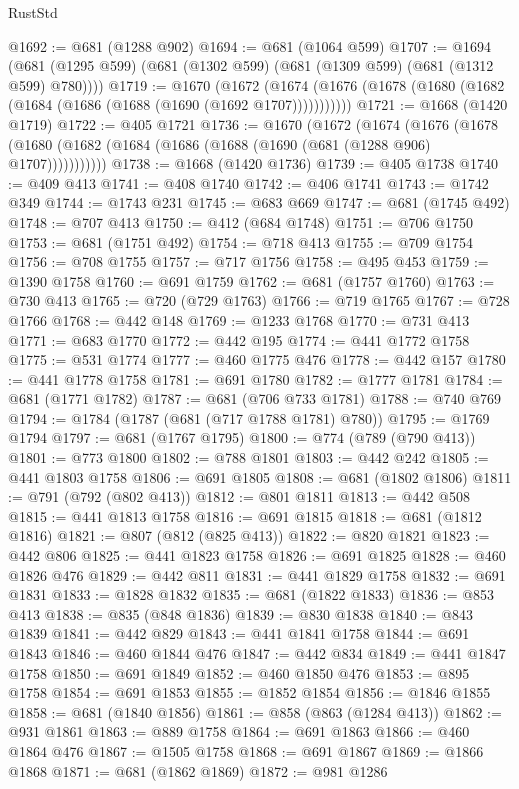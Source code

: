 \begin{lexlean}{RustStd}
\begin{coremodule}
@1692 := @681 (@1288 @902)
@1694 := @681 (@1064 @599)
@1707 := @1694 (@681 (@1295 @599) (@681 (@1302 @599) (@681 (@1309 @599) (@681 (@1312 @599) @780))))
@1719 := @1670
    (@1672 (@1674 (@1676 (@1678 (@1680 (@1682 (@1684 (@1686 (@1688 (@1690 (@1692 @1707)))))))))))
@1721 := @1668 (@1420 @1719)
@1722 := @405 @1721
@1736 := @1670
    (@1672
      (@1674
        (@1676 (@1678 (@1680 (@1682 (@1684 (@1686 (@1688 (@1690 (@681 (@1288 @906) @1707)))))))))))
@1738 := @1668 (@1420 @1736)
@1739 := @405 @1738
@1740 := @409 @413
@1741 := @408 @1740
@1742 := @406 @1741
@1743 := @1742 @349
@1744 := @1743 @231
@1745 := @683 @669
@1747 := @681 (@1745 @492)
@1748 := @707 @413
@1750 := @412 (@684 @1748)
@1751 := @706 @1750
@1753 := @681 (@1751 @492)
@1754 := @718 @413
@1755 := @709 @1754
@1756 := @708 @1755
@1757 := @717 @1756
@1758 := @495 @453
@1759 := @1390 @1758
@1760 := @691 @1759
@1762 := @681 (@1757 @1760)
@1763 := @730 @413
@1765 := @720 (@729 @1763)
@1766 := @719 @1765
@1767 := @728 @1766
@1768 := @442 @148
@1769 := @1233 @1768
@1770 := @731 @413
@1771 := @683 @1770
@1772 := @442 @195
@1774 := @441 @1772 @1758
@1775 := @531 @1774
@1777 := @460 @1775 @476
@1778 := @442 @157
@1780 := @441 @1778 @1758
@1781 := @691 @1780
@1782 := @1777 @1781
@1784 := @681 (@1771 @1782)
@1787 := @681 (@706 @733 @1781)
@1788 := @740 @769
@1794 := @1784 (@1787 (@681 (@717 @1788 @1781) @780))
@1795 := @1769 @1794
@1797 := @681 (@1767 @1795)
@1800 := @774 (@789 (@790 @413))
@1801 := @773 @1800
@1802 := @788 @1801
@1803 := @442 @242
@1805 := @441 @1803 @1758
@1806 := @691 @1805
@1808 := @681 (@1802 @1806)
@1811 := @791 (@792 (@802 @413))
@1812 := @801 @1811
@1813 := @442 @508
@1815 := @441 @1813 @1758
@1816 := @691 @1815
@1818 := @681 (@1812 @1816)
@1821 := @807 (@812 (@825 @413))
@1822 := @820 @1821
@1823 := @442 @806
@1825 := @441 @1823 @1758
@1826 := @691 @1825
@1828 := @460 @1826 @476
@1829 := @442 @811
@1831 := @441 @1829 @1758
@1832 := @691 @1831
@1833 := @1828 @1832
@1835 := @681 (@1822 @1833)
@1836 := @853 @413
@1838 := @835 (@848 @1836)
@1839 := @830 @1838
@1840 := @843 @1839
@1841 := @442 @829
@1843 := @441 @1841 @1758
@1844 := @691 @1843
@1846 := @460 @1844 @476
@1847 := @442 @834
@1849 := @441 @1847 @1758
@1850 := @691 @1849
@1852 := @460 @1850 @476
@1853 := @895 @1758
@1854 := @691 @1853
@1855 := @1852 @1854
@1856 := @1846 @1855
@1858 := @681 (@1840 @1856)
@1861 := @858 (@863 (@1284 @413))
@1862 := @931 @1861
@1863 := @889 @1758
@1864 := @691 @1863
@1866 := @460 @1864 @476
@1867 := @1505 @1758
@1868 := @691 @1867
@1869 := @1866 @1868
@1871 := @681 (@1862 @1869)
@1872 := @981 @1286

\end{coremodule}
\end{lexlean}
